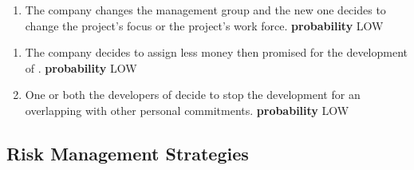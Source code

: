 \begin{itemize}
\begin{itemize}
		
		\begin{enumerate}
			\item The company changes the management group and the new one decides to change the project's focus or the project's work force.\newline
			\textbf{probability} LOW
		\end{enumerate}
		
		
		\begin{enumerate}
			\item The company decides to assign less money then promised for the development of \myTaxiService{}. \newline
			\textbf{probability} LOW
			\item One or both the developers of \myTaxiService{} decide to stop the development for an overlapping with other personal commitments.\newline
			\textbf{probability} LOW
		\end{enumerate}
	\end{itemize}
\end{itemize}
%
\subsection{Risk Management Strategies}





%
